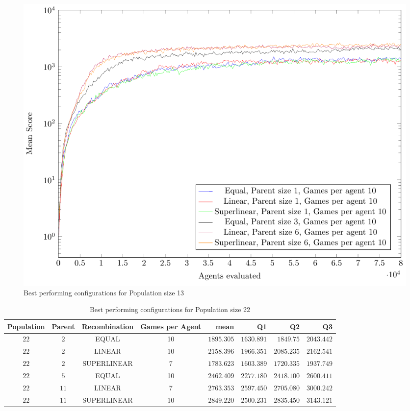 \begin{figure}[H]
\centering
\includegraphics[scale=1]{data/cma_population_offspring/bestofeach_population/13x/PlotFile.pdf}
\caption{Best performing configurations for Population size 13}
\end{figure}

\clearpage

\begin{table}[H]
\centering
\small
\begin{tabular}{c c c c r r r r}
Population & Parent & Recombination & Games per Agent & mean & Q1 & Q2 & Q3\\
\hline
$22$ & $2$ & EQUAL & 10 & $1895.305$ & $1630.891$ & $1849.75$ & $2043.442$\\
$22$ & $2$ & LINEAR & 10 & $2158.396$ & $1966.351$ & $2085.235$ & $2162.541$\\
$22$ & $2$ & SUPERLINEAR & 7 & $1783.623$ & $1603.389$ & $1720.335$ & $1937.749$\\
$22$ & $5$ & EQUAL & 10 & $2462.409$ & $2277.180$ & $2418.100$ & $2600.411$\\
$22$ & $11$ & LINEAR & 7 & $2763.353$ & $2597.450$ & $2705.080$ & $3000.242$\\
$22$ & $11$ & SUPERLINEAR & 10 & $2849.220$ & $2500.231$ & $2835.450$ & $3143.121$\\
\end{tabular}
\caption{Best performing configurations for Population size 22}
\end{table}

